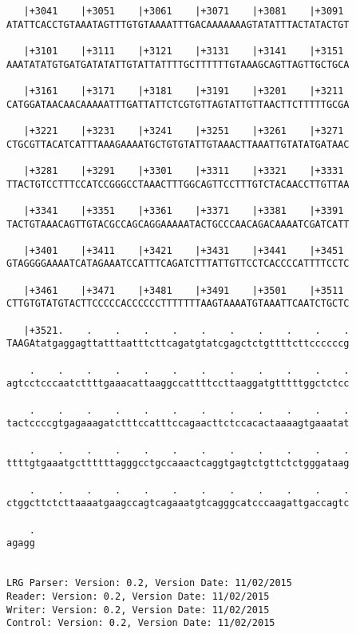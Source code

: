 \documentclass{article}
\begin{document}
\begin{Verbatim}
   |+3041    |+3051    |+3061    |+3071    |+3081    |+3091 
ATATTCACCTGTAAATAGTTTGTGTAAAATTTGACAAAAAAAGTATATTTACTATACTGT
                                                            
   |+3101    |+3111    |+3121    |+3131    |+3141    |+3151 
AAATATATGTGATGATATATTGTATTATTTTGCTTTTTTGTAAAGCAGTTAGTTGCTGCA
                                                            
   |+3161    |+3171    |+3181    |+3191    |+3201    |+3211 
CATGGATAACAACAAAAATTTGATTATTCTCGTGTTAGTATTGTTAACTTCTTTTTGCGA
                                                            
   |+3221    |+3231    |+3241    |+3251    |+3261    |+3271 
CTGCGTTACATCATTTAAAGAAAATGCTGTGTATTGTAAACTTAAATTGTATATGATAAC
                                                            
   |+3281    |+3291    |+3301    |+3311    |+3321    |+3331 
TTACTGTCCTTTCCATCCGGGCCTAAACTTTGGCAGTTCCTTTGTCTACAACCTTGTTAA
                                                            
   |+3341    |+3351    |+3361    |+3371    |+3381    |+3391 
TACTGTAAACAGTTGTACGCCAGCAGGAAAAATACTGCCCAACAGACAAAATCGATCATT
                                                            
   |+3401    |+3411    |+3421    |+3431    |+3441    |+3451 
GTAGGGGAAAATCATAGAAATCCATTTCAGATCTTTATTGTTCCTCACCCCATTTTCCTC
                                                            
   |+3461    |+3471    |+3481    |+3491    |+3501    |+3511 
CTTGTGTATGTACTTCCCCCACCCCCCTTTTTTTAAGTAAAATGTAAATTCAATCTGCTC
                                                            
   |+3521.    .    .    .    .    .    .    .    .    .    .
TAAGAtatgaggagttatttaatttcttcagatgtatcgagctctgttttcttccccccg
                                                            
    .    .    .    .    .    .    .    .    .    .    .    .
agtcctcccaatcttttgaaacattaaggccattttccttaaggatgtttttggctctcc
                                                            
    .    .    .    .    .    .    .    .    .    .    .    .
tactccccgtgagaaagatctttccatttccagaacttctccacactaaaagtgaaatat
                                                            
    .    .    .    .    .    .    .    .    .    .    .    .
ttttgtgaaatgcttttttagggcctgccaaactcaggtgagtctgttctctgggataag
                                                            
    .    .    .    .    .    .    .    .    .    .    .    .
ctggcttctcttaaaatgaagccagtcagaaatgtcagggcatcccaagattgaccagtc
                                                            
    .
agagg
     
     
LRG Parser: Version: 0.2, Version Date: 11/02/2015
Reader: Version: 0.2, Version Date: 11/02/2015
Writer: Version: 0.2, Version Date: 11/02/2015
Control: Version: 0.2, Version Date: 11/02/2015
\end{Verbatim}
\end{document}
